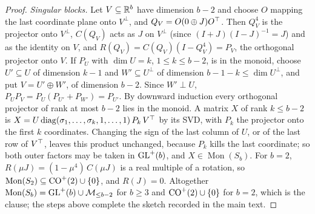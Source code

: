 \begin{proof}
\emph{Singular blocks.} Let $V\subseteq\mathbb{R}^b$ have dimension $b-2$ and choose $O$ mapping the last coordinate plane onto
$V^\perp$, and $Q_V=O(0\oplus J)O^{\top}$. Then $Q_V^4$ is the projector onto $V^\perp$, $C(Q_V)$ acts as $J$ on $V^\perp$ (since
$(I+J)(I-J)^{-1}=J$) and as the identity on $V$, and $R(Q_V)=C(Q_V)(I-Q_V^4)=P_V$, the orthogonal projector onto $V$. If
$P_U$ with $\dim U=k$, $1\le k\le b-2$, is in the monoid, choose $U'\subseteq U$ of dimension $k-1$ and $W'\subseteq U^\perp$
of dimension $b-1-k\le\dim U^\perp$, and put $V=U'\oplus W'$, of dimension $b-2$. Since $W'\perp U$,
$P_UP_V=P_U(P_{U'}+P_{W'})=P_{U'}$. By downward induction every orthogonal projector of rank at most $b-2$ lies in the
monoid. A matrix $X$ of rank $k\le b-2$ is $X=U\operatorname{diag}(\sigma_1,\dots,\sigma_k,1,\dots,1)\,P_k\,V^{\top}$ by its SVD, with $P_k$
the projector onto the first $k$ coordinates. Changing the sign of the last column of $U$, or of the last row of $V^{\top}$,
leaves this product unchanged, because $P_k$ kills the last coordinate; so both outer factors may be taken in $\mathrm{GL}^+(b)$,
and $X\in\operatorname{Mon}(S_b)$. For $b=2$, $R(\mu J)=(1-\mu^4)\,C(\mu J)$ is a real multiple of a rotation, so
$\operatorname{Mon}(S_2)\subseteq\mathrm{CO}^+(2)\cup\{0\}$, and $R(J)=0$. Altogether
$\operatorname{Mon}(S_b)=\mathrm{GL}^+(b)\cup\mathcal{M}_{\le b-2}$ for $b\ge3$ and $\mathrm{CO}^+(2)\cup\{0\}$ for $b=2$, which is the clause; the
steps above complete the sketch recorded in the main text.


\end{proof}
